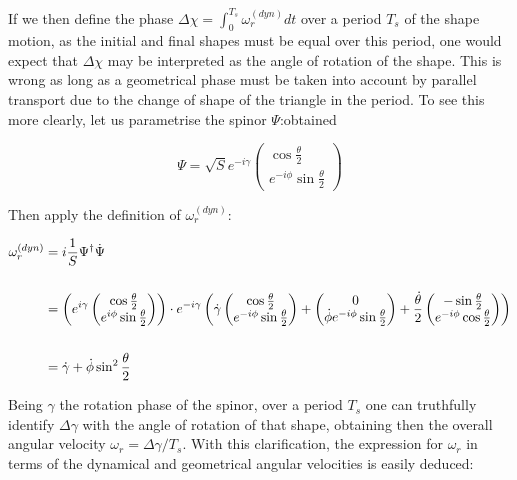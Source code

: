 If we then define the phase $\Delta \chi = \int_0^{T_s}\omega_r^{(dyn)}dt$ over a period $T_s$ of the shape motion, as the initial and final shapes must be equal over this period, one would expect that $\Delta \chi$ may be interpreted as the angle of rotation of the shape. This is wrong as long as a geometrical phase must be taken into account by parallel transport due to the change of shape of the triangle in the period. To see this more clearly, let us parametrise the spinor $\Psi$:obtained

\begin{equation*}
\Psi = \sqrt{S}e^{-i\gamma} \begin{pmatrix}\cos{\frac{\theta}{2}}\\
e^{-i\phi}\sin{\frac{\theta}{2}}\end{pmatrix}
\end{equation*}

Then apply the definition of $\omega_r^{(dyn)}$:

\begin{align*}
\omega_r^{(dyn)} &= i\frac{1}{S}\Psi^\dagger\dot{\Psi} \\
\\
&= \left( e^{i\gamma}\begin{pmatrix}\cos{\frac{\theta}{2}} \\e^{i\phi}\sin{\frac{\theta}{2}}\end{pmatrix} \right)\cdot e^{-i\gamma}\left( \dot{\gamma}\begin{pmatrix}\cos{\frac{\theta}{2}} \\e^{-i\phi}\sin{\frac{\theta}{2}}\end{pmatrix}+ \begin{pmatrix}0 \\ \dot{\phi}e^{-i\phi}\sin{\frac{\theta}{2}}\end{pmatrix} + \frac{\dot{\theta}}{2}\begin{pmatrix}-\sin{\frac{\theta}{2}} \\e^{-i\phi}\cos{\frac{\theta}{2}}\end{pmatrix} \right)\\
\\
&= \dot{\gamma}+\dot{\phi}\sin^2{\frac{\theta}{2}}
\end{align*}

Being $\gamma$ the rotation phase of the spinor, over a period $T_s$ one can truthfully identify $\Delta \gamma$ with the angle of rotation of that shape, obtaining then the overall angular velocity $\omega_r = \Delta \gamma /T_s$. With this clarification, the expression for $\omega_r$ in terms of the dynamical and geometrical angular velocities is easily deduced:


